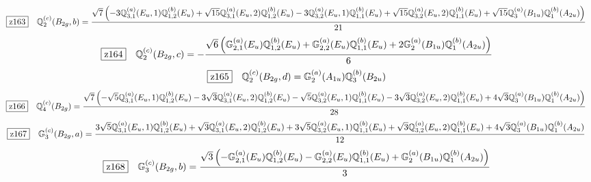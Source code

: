 \documentclass[fleqn,10pt,landscape]{jsarticle}
\begin{document}
\begin{dmath*}
\hspace*{3mm}\fbox{z163}\quad \mathbb{Q}_{2}^{(c)}(B_{2g},b)=\frac{\sqrt{7} \left(- 3 \mathbb{Q}_{3,1}^{(a)}(E_{u},1) \mathbb{Q}_{1,2}^{(b)}(E_{u}) + \sqrt{15} \mathbb{Q}_{3,1}^{(a)}(E_{u},2) \mathbb{Q}_{1,2}^{(b)}(E_{u}) - 3 \mathbb{Q}_{3,2}^{(a)}(E_{u},1) \mathbb{Q}_{1,1}^{(b)}(E_{u}) + \sqrt{15} \mathbb{Q}_{3,2}^{(a)}(E_{u},2) \mathbb{Q}_{1,1}^{(b)}(E_{u}) + \sqrt{15} \mathbb{Q}_{3}^{(a)}(B_{1u}) \mathbb{Q}_{1}^{(b)}(A_{2u})\right)}{21}
\end{dmath*}
\begin{dmath*}
\hspace*{3mm}\fbox{z164}\quad \mathbb{Q}_{2}^{(c)}(B_{2g},c)=- \frac{\sqrt{6} \left(\mathbb{G}_{2,1}^{(a)}(E_{u}) \mathbb{Q}_{1,2}^{(b)}(E_{u}) + \mathbb{G}_{2,2}^{(a)}(E_{u}) \mathbb{Q}_{1,1}^{(b)}(E_{u}) + 2 \mathbb{G}_{2}^{(a)}(B_{1u}) \mathbb{Q}_{1}^{(b)}(A_{2u})\right)}{6}
\end{dmath*}
\begin{dmath*}
\hspace*{3mm}\fbox{z165}\quad \mathbb{Q}_{2}^{(c)}(B_{2g},d)=\mathbb{G}_{2}^{(a)}(A_{1u}) \mathbb{Q}_{3}^{(b)}(B_{2u})
\end{dmath*}
\begin{dmath*}
\hspace*{3mm}\fbox{z166}\quad \mathbb{Q}_{4}^{(c)}(B_{2g})=\frac{\sqrt{7} \left(- \sqrt{5} \mathbb{Q}_{3,1}^{(a)}(E_{u},1) \mathbb{Q}_{1,2}^{(b)}(E_{u}) - 3 \sqrt{3} \mathbb{Q}_{3,1}^{(a)}(E_{u},2) \mathbb{Q}_{1,2}^{(b)}(E_{u}) - \sqrt{5} \mathbb{Q}_{3,2}^{(a)}(E_{u},1) \mathbb{Q}_{1,1}^{(b)}(E_{u}) - 3 \sqrt{3} \mathbb{Q}_{3,2}^{(a)}(E_{u},2) \mathbb{Q}_{1,1}^{(b)}(E_{u}) + 4 \sqrt{3} \mathbb{Q}_{3}^{(a)}(B_{1u}) \mathbb{Q}_{1}^{(b)}(A_{2u})\right)}{28}
\end{dmath*}
\begin{dmath*}
\hspace*{3mm}\fbox{z167}\quad \mathbb{G}_{3}^{(c)}(B_{2g},a)=\frac{3 \sqrt{5} \mathbb{Q}_{3,1}^{(a)}(E_{u},1) \mathbb{Q}_{1,2}^{(b)}(E_{u}) + \sqrt{3} \mathbb{Q}_{3,1}^{(a)}(E_{u},2) \mathbb{Q}_{1,2}^{(b)}(E_{u}) + 3 \sqrt{5} \mathbb{Q}_{3,2}^{(a)}(E_{u},1) \mathbb{Q}_{1,1}^{(b)}(E_{u}) + \sqrt{3} \mathbb{Q}_{3,2}^{(a)}(E_{u},2) \mathbb{Q}_{1,1}^{(b)}(E_{u}) + 4 \sqrt{3} \mathbb{Q}_{3}^{(a)}(B_{1u}) \mathbb{Q}_{1}^{(b)}(A_{2u})}{12}
\end{dmath*}
\begin{dmath*}
\hspace*{3mm}\fbox{z168}\quad \mathbb{G}_{3}^{(c)}(B_{2g},b)=\frac{\sqrt{3} \left(- \mathbb{G}_{2,1}^{(a)}(E_{u}) \mathbb{Q}_{1,2}^{(b)}(E_{u}) - \mathbb{G}_{2,2}^{(a)}(E_{u}) \mathbb{Q}_{1,1}^{(b)}(E_{u}) + \mathbb{G}_{2}^{(a)}(B_{1u}) \mathbb{Q}_{1}^{(b)}(A_{2u})\right)}{3}
\end{dmath*}
\end{document}
